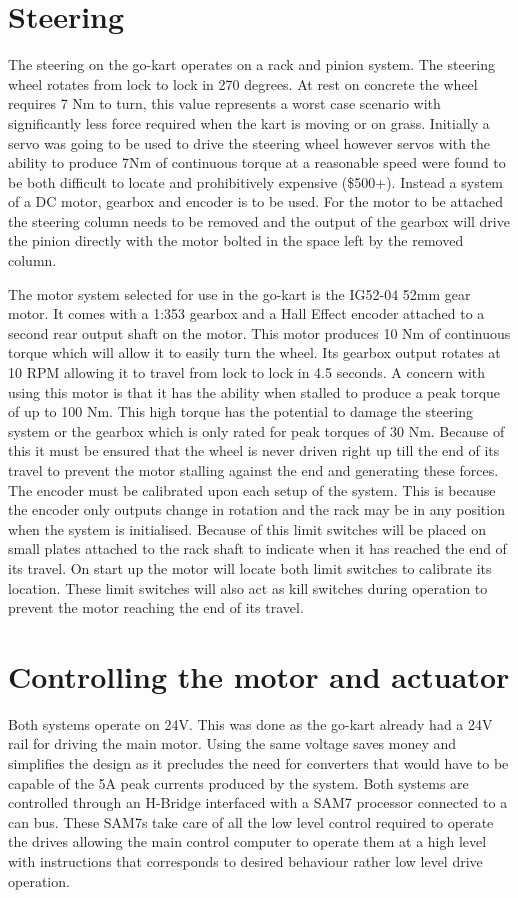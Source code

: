 \section{Steering}
The steering on the go-kart operates on a rack and pinion system. The steering wheel rotates from lock to lock in 270 degrees. At rest on concrete the wheel requires 7 Nm to turn, this value represents a worst case scenario with significantly less force required when the kart is moving or on grass. Initially a servo was going to be used to drive the steering wheel however servos with the ability to produce 7Nm of continuous torque at a reasonable speed were found to be both difficult to locate and prohibitively expensive (\$500+). Instead a system of a DC motor, gearbox and encoder is to be used. For the motor to be attached the steering column needs to be removed and the output of the gearbox will drive the pinion directly with the motor bolted in the space left by the removed column. %

The motor system selected for use in the go-kart is the IG52-04 52mm gear motor. It comes with a 1:353 gearbox and a Hall Effect encoder attached to a second rear output shaft on the motor. This motor produces 10 Nm of continuous torque which will allow it to easily turn the wheel. Its gearbox output rotates at 10 RPM allowing it to travel from lock to lock in 4.5 seconds. A concern with using this motor is that it has the ability when stalled to produce a peak torque of up to 100 Nm. This high torque has the potential to damage the steering system or the gearbox which is only rated for peak torques of 30 Nm. Because of this it must be ensured that the wheel is never driven right up till the end of its travel to prevent the motor stalling against the end and generating these forces. The encoder must be calibrated upon each setup of the system. This is because the encoder only outputs change in rotation and the rack may be in any position when the system is initialised. Because of this limit switches will be placed on small plates attached to the rack shaft to indicate when it has reached the end of its travel. On start up the motor will locate both limit switches to calibrate its location. These limit switches will also act as kill switches during operation to prevent the motor reaching the end of its travel.

\section{Controlling the motor and actuator}
Both systems operate on 24V. This was done as the go-kart already had a 24V rail for driving the main motor. Using the same voltage saves money and simplifies the design as it precludes the need for converters that would have to be capable of the 5A peak currents produced by the system. Both systems are controlled through an H-Bridge interfaced with a SAM7 processor connected to a can bus. These SAM7s take care of all the low level control required to operate the drives allowing the main control computer to operate them at a high level with instructions that corresponds to desired behaviour rather low level drive operation.

